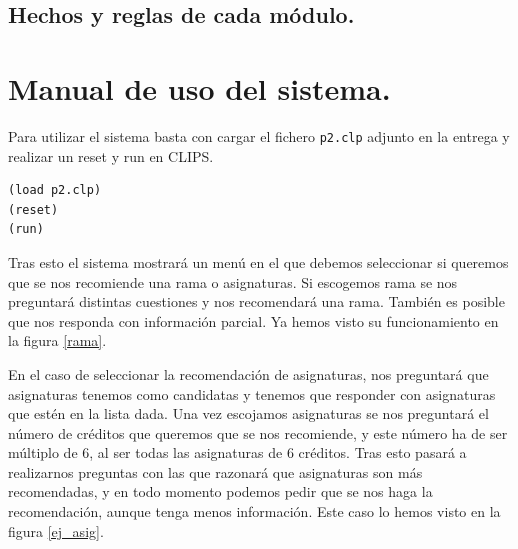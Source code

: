 \documentclass[12pt, spanish]{article}
\begin{document}
\subsection{Hechos y reglas de cada módulo.}


\newpage

\section{Manual de uso del sistema.}

Para utilizar el sistema basta con cargar el fichero \texttt{p2.clp} adjunto en la entrega y realizar un reset y run en CLIPS.

\begin{lstlisting}
(load p2.clp)
(reset)
(run)
\end{lstlisting}

Tras esto el sistema mostrará un menú en el que debemos seleccionar si queremos que se nos recomiende una rama o asignaturas. Si escogemos rama se nos preguntará distintas cuestiones y nos recomendará una rama. También es posible que nos responda con información parcial. Ya hemos visto su funcionamiento en la figura \ref{rama}.


En el caso de seleccionar la recomendación de asignaturas, nos preguntará que asignaturas tenemos como candidatas y tenemos que responder con asignaturas que estén en la lista dada. Una vez escojamos asignaturas se nos preguntará el número de créditos que queremos que se nos recomiende, y este número ha de ser múltiplo de 6, al ser todas las asignaturas de 6 créditos. Tras esto pasará a realizarnos preguntas con las que razonará que asignaturas son más recomendadas, y en todo momento podemos pedir que se nos haga la recomendación, aunque tenga menos información. Este caso lo hemos visto en la figura \ref{ej_asig}.
\end{document}
